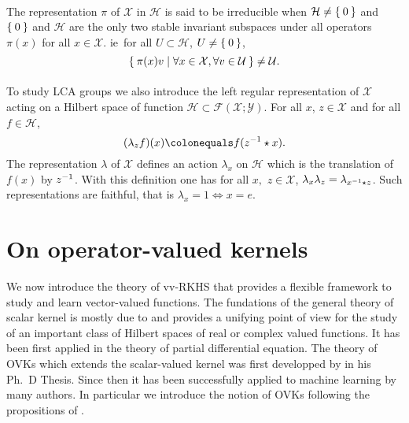 \paragraph{}
The representation $\pi$ of $\mathcal{X}$ in $\mathcal{H}$ is said to be
irreducible when $\mathcal{H}\neq \Set{0}$ and $\Set{0}$ and $\mathcal{H}$ are
the only two stable invariant subspaces under all operators $\pi(x)$ for all
$x\in\mathcal{X}$. \acs{ie}~for all $ U\subset\mathcal{H}$, $U\neq \Set{0}$,
\begin{dmath*}
    \Set{\pi(x)v|\forall x\in\mathcal{X},\forall v\in\mathcal{U}}\neq
    \mathcal{U}.
\end{dmath*}
\paragraph{}
To study \ac{LCA} groups we also introduce the left regular representation of
$\mathcal{X}$ acting on a Hilbert space of function
$\mathcal{H}\subset\mathcal{F}(\mathcal{X};\mathcal{Y})$. For all $x$,
$z\in\mathcal{X}$ and for all $f\in\mathcal{H}$,
\begin{dmath*}
    (\lambda_z f)(x)\colonequals f(\inv{z}\groupop x).
\end{dmath*}
The representation $\lambda$ of $\mathcal{X}$ defines an action $\lambda_x$ on
$\mathcal{H}$ which is the translation of $f(x)$ by ${z}^{-1}$. With this
definition one has for all $x,$ $z\in\mathcal{X}$,
$\lambda_x\lambda_z=\lambda_{{x}^{-1}\star z}$. Such representations are
faithful, that is $\lambda_x=1 \iff x=e$.

\section{On operator-valued kernels}
\label{sec:background_on_operator-valued_kernels} We now introduce the theory
of \acf{vv-RKHS} that provides a flexible framework to study and learn
vector-valued functions. The fundations of the general theory of scalar kernel
is mostly due to \citet{Aronszajn1950}  and provides a unifying point of view
for the study of an important class of Hilbert spaces of real or complex valued
functions. It has been first applied in the theory of partial differential
equation. The theory of \acfp{OVK} which extends the scalar-valued kernel was
first developped by \citet{Pedrick57} in his Ph.~D Thesis. Since then it has
been successfully applied to machine learning by many authors. In particular we
introduce the notion of \aclp{OVK} following the propositions of
\citet{Micchelli2005,carmeli2006vector,Carmeli2010}.

